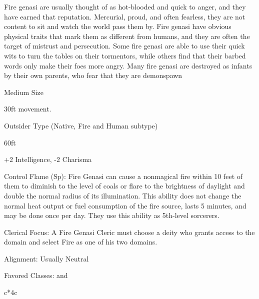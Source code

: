 
Fire genasi are usually thought of as hot-blooded and quick to anger, and they have earned that reputation. Mercurial, proud, and often fearless, they are not content to sit and watch the world pass them by. Fire genasi have obvious physical traits that mark them as different from humans, and they are often the target of mistrust and persecution. Some fire genasi are able to use their quick wits to turn the tables on their tormentors, while others find that their barbed words only make their foes more angry. Many fire genasi are destroyed as infants by their own parents, who fear that they are demonspawn

\begin{multicols}{2}

\begin{itemize*}
\item Medium Size
\item 30ft movement.
\item Outsider Type (Native, Fire and Human subtype)
\item {} 60ft
\item +2 Intelligence, -2 Charisma
\item Control Flame (Sp): Fire Genasi can cause a nonmagical fire within 10 feet of them to diminish to the level of coals or flare to the brightness of daylight and double the normal radius of its illumination. This ability does not change the normal heat output or fuel consumption of the fire source, lasts 5 minutes, and may be done once per day. They use this ability as 5th-level sorcerers.
\item Clerical Focus: A Fire Genasi Cleric must choose a deity who grants access to the  domain and select Fire as one of his two domains.
\item Alignment: Usually Neutral
\item Favored Classes:  and 
\end{itemize*}

\begin{multicolsbasictable}{c*{4}{c}}


\end{multicolsbasictable}
\end{multicols}
